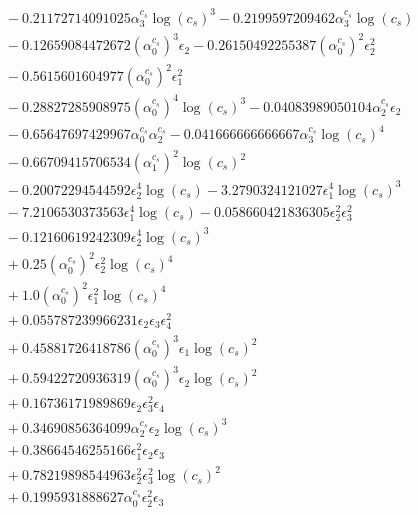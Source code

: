 \documentclass[10pt]{article}
\begin{document}
\begin{align*}
&{}  - 0.21172714091025 \alpha_{3}^{c_s} \log{\left(c_{s} \right)}^{3} - 0.2199597209462 \alpha_{3}^{c_s} \log{\left(c_{s} \right)} \\
&{}  - 0.12659084472672 \left(\alpha_{0}^{c_s}\right)^{3} \epsilon_{2} - 0.26150492255387 \left(\alpha_{0}^{c_s}\right)^{2} \epsilon_{2}^{2} \\
&{}  - 0.5615601604977 \left(\alpha_{0}^{c_s}\right)^{2} \epsilon_{1}^{2} \\
&{}  - 0.28827285908975 \left(\alpha_{0}^{c_s}\right)^{4} \log{\left(c_{s} \right)}^{3} - 0.04083989050104 \alpha_{2}^{c_s} \epsilon_{2} \\
&{}  - 0.65647697429967 \alpha_{0}^{c_s} \alpha_{2}^{c_s} - 0.041666666666667 \alpha_{3}^{c_s} \log{\left(c_{s} \right)}^{4} \\
&{}  - 0.66709415706534 \left(\alpha_{1}^{c_s}\right)^{2} \log{\left(c_{s} \right)}^{2} \\
&{}  - 0.20072294544592 \epsilon_{2}^{4} \log{\left(c_{s} \right)} - 3.2790324121027 \epsilon_{1}^{4} \log{\left(c_{s} \right)}^{3} \\
&{}  - 7.2106530373563 \epsilon_{1}^{4} \log{\left(c_{s} \right)} - 0.058660421836305 \epsilon_{2}^{2} \epsilon_{3}^{2} \\
&{}  - 0.12160619242309 \epsilon_{2}^{4} \log{\left(c_{s} \right)}^{3} \\
&{}  + 0.25 \left(\alpha_{0}^{c_s}\right)^{2} \epsilon_{2}^{2} \log{\left(c_{s} \right)}^{4} \\
&{}  + 1.0 \left(\alpha_{0}^{c_s}\right)^{2} \epsilon_{1}^{2} \log{\left(c_{s} \right)}^{4} \\
&{}  + 0.055787239966231 \epsilon_{2} \epsilon_{3} \epsilon_{4}^{2} \\
&{}  + 0.45881726418786 \left(\alpha_{0}^{c_s}\right)^{3} \epsilon_{1} \log{\left(c_{s} \right)}^{2} \\
&{}  + 0.59422720936319 \left(\alpha_{0}^{c_s}\right)^{3} \epsilon_{2} \log{\left(c_{s} \right)}^{2} \\
&{}  + 0.16736171989869 \epsilon_{2} \epsilon_{3}^{2} \epsilon_{4} \\
&{}  + 0.34690856364099 \alpha_{2}^{c_s} \epsilon_{2} \log{\left(c_{s} \right)}^{3} \\
&{}  + 0.38664546255166 \epsilon_{1}^{2} \epsilon_{2} \epsilon_{3} \\
&{}  + 0.78219898544963 \epsilon_{2}^{2} \epsilon_{3}^{2} \log{\left(c_{s} \right)}^{2} \\
&{}  + 0.1995931888627 \alpha_{0}^{c_s} \epsilon_{2}^{2} \epsilon_{3} \\

\end{align*}
\end{document}
